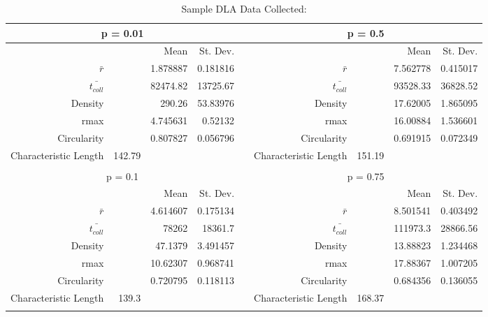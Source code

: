 \documentclass{article}
\begin{document}
\begin{appendix}
\begin{table}
  \centering
  \caption{Sample DLA Data Collected:}
    \begin{tabular}{rrrrrrrrr}
    \toprule
    \multicolumn{4}{c}{p = 0.01}  & \multicolumn{1}{c}{} & \multicolumn{4}{c}{p = 0.5} \\
    \midrule
          &       & Mean  & St. Dev. &       &       &       & Mean  & St. Dev. \\
    $\bar{r}$   &       & 1.878887 & 0.181816 &       & $\bar{r}$   &       & 7.562778 & 0.415017 \\
    $\bar{t_{coll}}$   &       & 82474.82 & 13725.67 &       & $\bar{t_{coll}}$   &       & 93528.33 & 36828.52 \\
    Density &       & 290.26 & 53.83976 &       & Density &       & 17.62005 & 1.865095 \\
    rmax  &       & 4.745631 & 0.52132 &       & rmax  &       & 16.00884 & 1.536601 \\
    Circularity &       & 0.807827 & 0.056796 &       & Circularity &       & 0.691915 & 0.072349 \\
    Characteristic Length & 142.79 &       &       &       & Characteristic Length & 151.19 &       &  \\
          &       &       &       &       &       &       &       &  \\
    \midrule
		\multicolumn{4}{c}{p = 0.1}   & \multicolumn{1}{c}{} & \multicolumn{4}{c}{p = 0.75} \\
    \midrule
					&       & Mean  & St. Dev. &       &       &       & Mean  & St. Dev. \\
    $\bar{r}$   &       & 4.614607 & 0.175134 &       & $\bar{r}$   &       & 8.501541 & 0.403492 \\
    $\bar{t_{coll}}$   &       & 78262 & 18361.7 &       & $\bar{t_{coll}}$   &       & 111973.3 & 28866.56 \\
    Density &       & 47.1379 & 3.491457 &       & Density &       & 13.88823 & 1.234468 \\
    rmax  &       & 10.62307 & 0.968741 &       & rmax  &       & 17.88367 & 1.007205 \\
    Circularity &       & 0.720795 & 0.118113 &       & Circularity &       & 0.684356 & 0.136055 \\
    Characteristic Length & 139.3 &       &       &       & Characteristic Length & 168.37 &       &  \\
          &       &       &       &       &       &       &       &  \\

\end{tabular}
\end{table}
\end{appendix}
\end{document}
